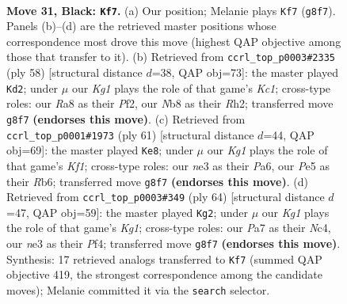 \documentclass[11pt]{article}
\begin{document}
\clearpage

\begin{figure}[p]\centering
\begin{subfigure}{0.46\textwidth}\centering
\resizebox{\linewidth}{!}{%
\newchessgame
\chessboard[
  setfen={rnR3k1/p5pp/5p2/1P2p2P/P7/4Nb2/8/R1K5 b - - 1 31},
  showmover=false,
  pgfstyle=straightmove, color=movearrow, markmove={g8-f7}
]}
\caption{}
\end{subfigure}\hfill
\begin{subfigure}{0.46\textwidth}\centering
\resizebox{\linewidth}{!}{%
\newchessgame
\chessboard[
  setfen={3r3k/5p1n/4p2B/1p2P3/3pN3/P7/1PP2P1R/2K3r1 w - - 2 30},
  showmover=false,
  pgfstyle=straightmove, color=movearrow, markmove={c1-d2}
]}
\caption{}
\end{subfigure}
\\[4pt]
\begin{subfigure}{0.46\textwidth}\centering
\resizebox{\linewidth}{!}{%
\newchessgame
\chessboard[
  setfen={5k2/1p4pp/pr6/1b4P1/3P1R1P/2N5/1P3K2/8 b - - 1 31},
  showmover=false,
  pgfstyle=straightmove, color=movearrow, markmove={f8-e8}
]}
\caption{}
\end{subfigure}\hfill
\begin{subfigure}{0.46\textwidth}\centering
\resizebox{\linewidth}{!}{%
\newchessgame
\chessboard[
  setfen={3r2k1/5p2/R3p1pp/2Rn4/2N2P2/6P1/5P1P/1r4K1 w - - 1 33},
  showmover=false,
  pgfstyle=straightmove, color=movearrow, markmove={g1-g2}
]}
\caption{}
\end{subfigure}
\caption{\textbf{Move 31, Black: \texttt{Kf7}.} (a) Our position; Melanie plays \texttt{Kf7} (\texttt{g8f7}). Panels (b)--(d) are the retrieved master positions whose correspondence most drove this move (highest QAP objective among those that transfer to it). (b) Retrieved from \texttt{ccrl\_top\_p0003\#2335} (ply 58) [structural distance $d$=38, QAP obj=73]: the master played \texttt{Kd2}; under $\mu$ our \emph{Kg1} plays the role of that game's \emph{Kc1}; cross-type roles: our \emph{R}a8 as their \emph{P}f2, our \emph{N}b8 as their \emph{R}h2; transferred move \texttt{g8f7} \textbf{(endorses this move)}. (c) Retrieved from \texttt{ccrl\_top\_p0001\#1973} (ply 61) [structural distance $d$=44, QAP obj=69]: the master played \texttt{Ke8}; under $\mu$ our \emph{Kg1} plays the role of that game's \emph{Kf1}; cross-type roles: our \emph{n}e3 as their \emph{P}a6, our \emph{P}e5 as their \emph{R}b6; transferred move \texttt{g8f7} \textbf{(endorses this move)}. (d) Retrieved from \texttt{ccrl\_top\_p0003\#349} (ply 64) [structural distance $d$=47, QAP obj=59]: the master played \texttt{Kg2}; under $\mu$ our \emph{Kg1} plays the role of that game's \emph{Kg1}; cross-type roles: our \emph{P}a7 as their \emph{N}c4, our \emph{n}e3 as their \emph{P}f4; transferred move \texttt{g8f7} \textbf{(endorses this move)}. Synthesis: 17 retrieved analogs transferred to \texttt{Kf7} (summed QAP objective 419, the strongest correspondence among the candidate moves); Melanie committed it via the \texttt{search} selector.}
\label{fig:thought-m61}
\end{figure}
\end{document}
